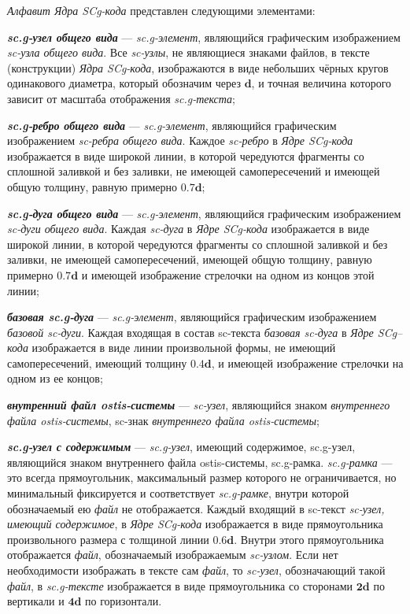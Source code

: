 \textit{Алфавит Ядра SCg-кода\scnsupergroupsign} представлен следующими элементами:
\begin{textitemize}
	\item \textbf{\textit{sc.g-узел общего вида}} --- \textit{sc.g-элемент}, являющийся графическим изображением \textit{sc-узла общего вида}. Все \textit{sc-узлы}, не являющиеся знаками файлов, в тексте (конструкции) \textit{Ядра SCg-кода}, изображаются в виде небольших чёрных кругов одинакового диаметра, который обозначим через $\bm{d}$, и точная величина которого зависит от масштаба отображения \textit{sc.g-текста};
	
	\item \textbf{\textit{sc.g-ребро общего вида}} --- \textit{sc.g-элемент}, являющийся графическим изображением \textit{sc-ребра общего вида}. Каждое \textit{sc-ребро} в \textit{Ядре SCg-кода} изображается в виде широкой линии, в которой чередуются фрагменты со сплошной заливкой и без заливки, не имеющей самопересечений и имеющей общую толщину, равную примерно $\bm{0.7d}$;
	
	\item \textbf{\textit{sc.g-дуга общего вида}} --- \textit{sc.g-элемент}, являющийся графическим изображением \textit{sc-дуги общего вида}. Каждая \textit{sc-дуга} в \textit{Ядре SCg-кода} изображается в виде широкой линии, в которой чередуются фрагменты со сплошной заливкой и без заливки, не имеющей самопересечений, имеющей общую толщину, равную примерно $\bm{0.7d}$ и имеющей изображение стрелочки на одном из концов этой линии;
	
	\item \textbf{\textit{базовая sc.g-дуга}} --- \textit{sc.g-элемент}, являющийся графическим изображением \textit{базовой sc-дуги}. Каждая входящая в состав sc-текста \textit{базовая sc-дуга} в \textit{Ядре SCg--кода} изображается в виде линии произвольной формы, не имеющий самопересечений, имеющий толщину $\bm{0.4d}$, и имеющей изображение стрелочки на одном из ее концов;
	
	\item \textbf{\textit{внутренний файл ostis-системы}} --- \textit{sc-узел}, являющийся знаком \textit{внутреннего файла ostis-системы}, sc-знак \textit{внутреннего файла ostis-системы};
	
	\item \textbf{\textit{sc.g-узел с содержимым}} --- \textit{sc.g-узел}, имеющий содержимое, sc.g-узел, являющийся знаком внутреннего файла ostis-системы, sc.g-рамка. \textit{sc.g-рамка} --- это всегда прямоугольник, максимальный размер которого не ограничивается, но минимальный фиксируется и соответствует \textit{sc.g-рамке}, внутри которой обозначаемый ею \textit{файл} не отображается. Каждый входящий в sc-текст \textit{sc-узел, имеющий содержимое}, в \textit{Ядре SCg-кода} изображается в виде прямоугольника произвольного размера с толщиной линии $\bm{0.6d}$. Внутри этого прямоугольника отображается \textit{файл}, обозначаемый изображаемым \textit{sc-узлом}. Если нет необходимости изображать в тексте сам \textit{файл}, то \textit{sc-узел}, обозначающий такой \textit{файл}, в \textit{sc.g-тексте} изображается в виде прямоугольника со сторонами $\bm{2d}$ по вертикали и $\bm{4d}$ по горизонтали.
\end{textitemize}


